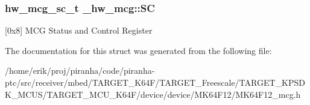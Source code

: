 \subsubsection[{\texorpdfstring{SC}{SC}}]{ {\bf hw\+\_\+mcg\+\_\+sc\+\_\+t} \+\_\+hw\+\_\+mcg\+::\+SC}\hypertarget{struct__hw__mcg_a00fba9e45e5186dc56941c74b4073505}{}\label{struct__hw__mcg_a00fba9e45e5186dc56941c74b4073505}
\mbox{[}0x8\mbox{]} M\+CG Status and Control Register 

The documentation for this struct was generated from the following file\+:\begin{DoxyCompactItemize}
\item 
/home/erik/proj/piranha/code/piranha-\/ptc/src/receiver/mbed/\+T\+A\+R\+G\+E\+T\+\_\+\+K64\+F/\+T\+A\+R\+G\+E\+T\+\_\+\+Freescale/\+T\+A\+R\+G\+E\+T\+\_\+\+K\+P\+S\+D\+K\+\_\+\+M\+C\+U\+S/\+T\+A\+R\+G\+E\+T\+\_\+\+M\+C\+U\+\_\+\+K64\+F/device/device/\+M\+K64\+F12/M\+K64\+F12\+\_\+mcg.\+h\end{DoxyCompactItemize}

